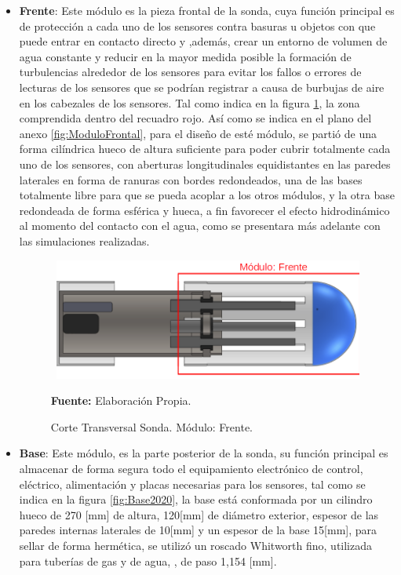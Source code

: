 \begin{itemize}
    \item \textbf{Frente}: Este m\'odulo es la pieza frontal de la sonda, cuya funci\'on principal es de protecci\'on a cada uno de los sensores contra basuras u objetos con que puede entrar en contacto directo y ,adem\'as, crear un entorno de volumen de agua constante y reducir en la mayor medida posible la formaci\'on de turbulencias alrededor de los sensores para evitar los fallos o errores de lecturas de los sensores que se podr\'ian registrar a causa de burbujas de aire en los cabezales de los sensores. Tal como indica en la figura \ref{fig:Frente}, la zona comprendida dentro del recuadro rojo. As\'i como se indica en el plano del anexo \ref{fig:ModuloFrontal}, para el dise\~no de est\'e m\'odulo, se parti\'o de una forma cil\'indrica hueco de altura suficiente para poder cubrir totalmente cada uno de los sensores, con aberturas longitudinales equidistantes en las paredes laterales en forma de ranuras con bordes redondeados, una de las bases totalmente libre para que se pueda acoplar a los otros m\'odulos, y  la otra base redondeada de forma esf\'erica y hueca, a fin favorecer el efecto hidrodin\'amico al momento del contacto con el agua, como se presentara m\'as adelante con las simulaciones realizadas.
    
    \begin{figure}[ht]
        \centering
        \includegraphics[width=110mm, height=40mm]{Imagenes/cap3/CompletoV5_Frente.png}
        \caption[Corte Transversal]{Corte Transversal Sonda. M\'odulo: Frente.}\textbf{Fuente:} Elaboración Propia.
        \label{fig:Frente}
    \end{figure}
    \item \textbf{Base}: Este m\'odulo, es la parte posterior de la sonda, su función principal es almacenar de forma segura todo el equipamiento electr\'onico de control, el\'ectrico, alimentación y placas necesarias para los sensores, tal como se indica en la figura \ref{fig:Base2020}, la base est\'a conformada por un cilindro hueco de 270 [mm] de altura, 120[mm] de di\'ametro exterior, espesor de las paredes internas laterales de 10[mm] y un espesor de la base 15[mm],  para sellar de forma herm\'etica, se utilizó un roscado Whitworth fino, utilizada para tuber\'ias de gas y de agua, \cite{falk_metalotecnia_1986}, de paso 1,154 [mm].
    

\end{itemize}
